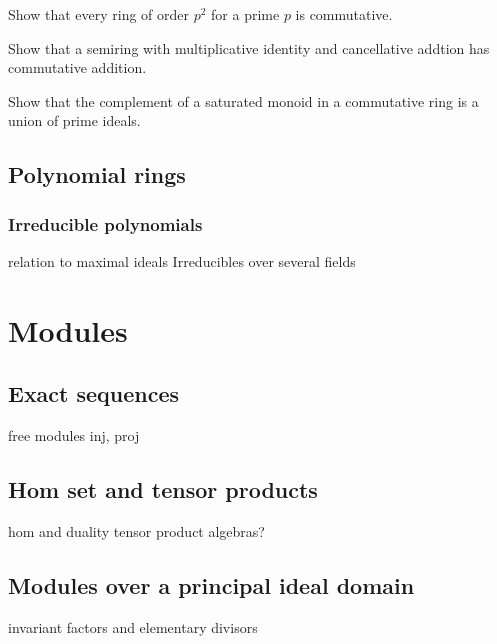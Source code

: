 \documentclass{../note}
\begin{document}
\begin{prb}
Show that every ring of order $p^2$ for a prime $p$ is commutative.
\end{prb}

\begin{prb}
Show that a semiring with multiplicative identity and cancellative addtion has commutative addition.
\end{prb}

\begin{prb}
Show that the complement of a saturated monoid in a commutative ring is a union of prime ideals.
\end{prb}


\chapter{Polynomial rings}
\section{Irreducible polynomials}
relation to maximal ideals
Irreducibles over several fields













\part{Modules}

\chapter{Exact sequences}
free modules
inj, proj

\chapter{Hom set and tensor products}
hom and duality
tensor product
algebras?

\chapter{Modules over a principal ideal domain}
invariant factors and elementary divisors
\end{document}
